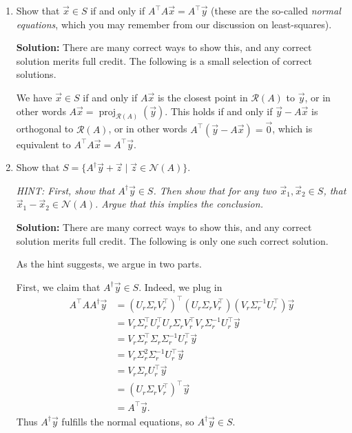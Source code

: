 \documentclass[10pt]{article}
\theoremstyle{definition}
\theoremstyle{plain}
\newcommand{\NN}{\mathcal{N}}
\newcommand{\Range}{\mathcal{R}}
\DeclareMathOperator{\proj}{proj}
\begin{document}
\begin{enumerate}[label=(\alph*), start=3]
\item Show that $\vec{x} \in S$ if and only if $A^\top A \vec{x} = A^\top \vec{y}$ (these are the so-called \textit{normal equations}, which you may remember from our discussion on least-squares).

\textbf{Solution:} There are many correct ways to show this, and any correct solution merits full credit. The following is a small selection of correct solutions.

We have $\vec{x} \in S$ if and only if $A\vec{x}$ is the closest point in $\Range(A)$ to $\vec{y}$, or in other words $A\vec{x} = \proj_{\Range(A)}(\vec{y})$. This holds if and only if $\vec{y} - A\vec{x}$ is orthogonal to $\Range(A)$, or in other words $A^\top(\vec{y} - A\vec{x}) = \vec{0}$, which is equivalent to $A^\top A \vec{x} = A^\top \vec{y}$.

\item Show that $S = \{A^\dagger \vec{y} + \vec{z} \mid \vec{z} \in \NN(A)\}$.

\textit{HINT: First, show that $A^\dagger \vec{y} \in S$. Then show that for any two $\vec{x}_1, \vec{x}_2 \in S$, that $\vec{x}_1 - \vec{x}_2 \in \NN(A)$. Argue that this implies the conclusion.}

\textbf{Solution:} There are many correct ways to show this, and any correct solution merits full credit. The following is only one such correct solution.

As the hint suggests, we argue in two parts.

First, we claim that $A^\dagger \vec{y} \in S$. Indeed, we plug in
\begin{align}
A^\top A A^\dagger \vec{y} &= (U_r \Sigma_r V_r^\top)^\top (U_r \Sigma_r V_r^\top)(V_r \Sigma_r^{-1} U_r^\top) \vec{y} \\
&= V_r \Sigma_r^\top U_r^\top U_r \Sigma_r V_r^\top V_r \Sigma_r^{-1} U_r^\top \vec{y} \\
&= V_r \Sigma_r^\top \Sigma_r \Sigma_r^{-1} U_r^\top \vec{y} \\
&= V_r \Sigma_r^2 \Sigma_r^{-1} U_r^\top \vec{y} \\
&= V_r \Sigma_r U_r^\top \vec{y} \\
&= (U_r \Sigma_r V_r^\top)^\top \vec{y} \\
&= A^\top \vec{y}.
\end{align}
Thus $A^\dagger \vec{y}$ fulfills the normal equations, so $A^\dagger \vec{y} \in S$.


\end{enumerate}
\end{document}
